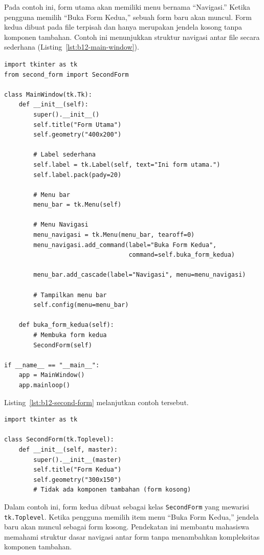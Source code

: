 Pada contoh ini, form utama akan memiliki menu bernama “Navigasi.” Ketika pengguna memilih “Buka Form Kedua,” sebuah form baru akan muncul. Form kedua dibuat pada file terpisah dan hanya merupakan jendela kosong tanpa komponen tambahan. Contoh ini menunjukkan struktur navigasi antar file secara sederhana (Listing~\ref{lst:b12-main-window}).

\begin{lstlisting}[style=PythonStyle, caption={main_window.py: Form Utama dengan Menu Navigasi}, label={lst:b12-main-window}]
import tkinter as tk
from second_form import SecondForm

class MainWindow(tk.Tk):
    def __init__(self):
        super().__init__()
        self.title("Form Utama")
        self.geometry("400x200")

        # Label sederhana
        self.label = tk.Label(self, text="Ini form utama.")
        self.label.pack(pady=20)

        # Menu bar
        menu_bar = tk.Menu(self)

        # Menu Navigasi
        menu_navigasi = tk.Menu(menu_bar, tearoff=0)
        menu_navigasi.add_command(label="Buka Form Kedua",
                                  command=self.buka_form_kedua)

        menu_bar.add_cascade(label="Navigasi", menu=menu_navigasi)

        # Tampilkan menu bar
        self.config(menu=menu_bar)

    def buka_form_kedua(self):
        # Membuka form kedua
        SecondForm(self)

if __name__ == "__main__":
    app = MainWindow()
    app.mainloop()
\end{lstlisting}

Listing~\ref{lst:b12-second-form} melanjutkan contoh tersebut.

\begin{lstlisting}[style=PythonStyle, caption={second_form.py: Form Kedua Kosong}, label={lst:b12-second-form}]
import tkinter as tk

class SecondForm(tk.Toplevel):
    def __init__(self, master):
        super().__init__(master)
        self.title("Form Kedua")
        self.geometry("300x150")
        # Tidak ada komponen tambahan (form kosong)
\end{lstlisting}

Dalam contoh ini, form kedua dibuat sebagai kelas \texttt{SecondForm} yang mewarisi \texttt{tk.Toplevel}. Ketika pengguna memilih item menu “Buka Form Kedua,” jendela baru akan muncul sebagai form kosong. Pendekatan ini membantu mahasiswa memahami struktur dasar navigasi antar form tanpa menambahkan kompleksitas komponen tambahan.


